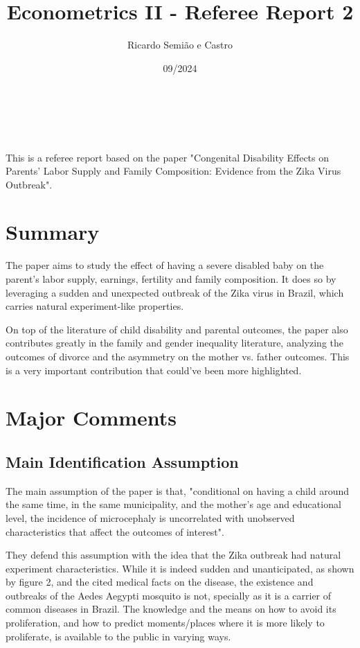 \documentclass[12pt]{article}
\title{Econometrics II - Referee Report 2}
\author{Ricardo Semião e Castro}
\date{09/2024}
\makeatletter
\renewcommand{\maketitle}{
  \begin{center}
    {\Huge \@title}\\[2em]
    {\large \@author \hfill \@date}\\[2em]
  \end{center}
}
\makeatother
\begin{document}
\maketitle

This is a referee report based on the paper "Congenital Disability Effects on Parents' Labor Supply and Family Composition: Evidence from the Zika Virus Outbreak".


\section{Summary}

The paper aims to study the effect of having a severe disabled baby on the parent's labor supply, earnings, fertility and family composition. It does so by leveraging a sudden and unexpected outbreak of the Zika virus in Brazil, which carries natural experiment-like properties.

On top of the literature of child disability and parental outcomes, the paper also contributes greatly in the family and gender inequality literature, analyzing the outcomes of divorce and the asymmetry on the mother vs. father outcomes. This is a very important contribution that could've been more highlighted.


\section{Major Comments}

\subsection{Main Identification Assumption}

The main assumption of the paper is that, "conditional on having a child around the same time, in the same municipality, and the mother's age and educational level, the incidence of microcephaly is uncorrelated with unobserved characteristics that affect the outcomes of interest".

They defend this assumption with the idea that the Zika outbreak had natural experiment characteristics. While it is indeed sudden and unanticipated, as shown by figure 2, and the cited medical facts on the disease, the existence and outbreaks of the Aedes Aegypti mosquito is not, specially as it is a carrier of common diseases in Brazil. The knowledge and the means on how to avoid its proliferation, and how to predict moments/places where it is more likely to proliferate, is available to the public in varying ways. 
\end{document}

